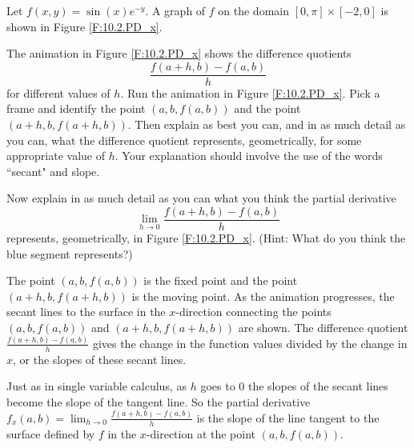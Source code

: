 \begin{activity} \label{A:10.2.3} Let $f(x,y) = \sin(x)e^{-y}$. A graph of $f$ on the domain $[0,\pi] \times [-2,0]$ is shown in Figure \ref{F:10.2.PD_x}.
    \ba
	\item The animation in Figure \ref{F:10.2.PD_x} shows the difference quotients
\[\frac{f(a+h,b) - f(a,b)}{h}\]
for different values of $h$. Run the animation in Figure \ref{F:10.2.PD_x}. Pick a frame and identify the point $(a,b,f(a,b))$ and the point $(a+h,b,f(a+h,b))$. Then explain as best you can, and in as much detail as you can, what the difference quotient
represents, geometrically, for some appropriate value of $h$. Your explanation should involve the use of the words ``secant" and slope.



    \item Now explain in as much detail as you can what you think the partial derivative
\[\lim_{h \to 0} \frac{f(a+h,b) - f(a,b)}{h}\]
represents, geometrically, in Figure \ref{F:10.2.PD_x}. (Hint: What do you think the blue segment represents?)



  \ea

\end{activity}
\begin{smallhint}

\end{smallhint}
\begin{bighint}

\end{bighint}
\begin{activitySolution}
\ba
\item The point $(a,b,f(a,b))$ is the fixed point and the point $(a+h,b,f(a+h,b))$ is the moving point. As the animation progresses, the secant lines to the surface in the $x$-direction connecting the points $(a,b,f(a,b))$ and $(a+h,b,f(a+h,b))$ are shown. The difference quotient $\frac{f(a+h,b) - f(a,b)}{h}$ gives the change in the function values divided by the change in $x$, or the slopes of these secant lines.
\item Just as in single variable calculus, as $h$ goes to $0$ the slopes of the secant lines become the slope of the tangent line. So the partial derivative $f_x(a,b) = \lim_{h \to 0} \frac{f(a+h,b) - f(a,b)}{h}$ is the slope of the line tangent to the surface defined by $f$ in the $x$-direction at the point $(a,b, f(a,b))$. 
\ea
\end{activitySolution}
\aftera

